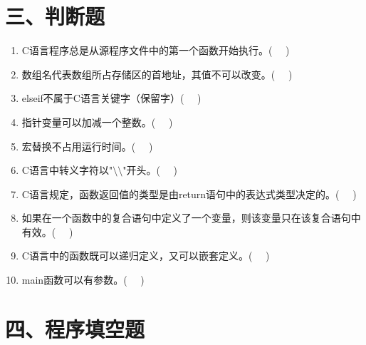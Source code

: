 \documentclass[a4paper,12pt]{article}
\begin{document}
\section*{三、判断题}

\begin{enumerate}
	\item C语言程序总是从源程序文件中的第一个函数开始执行。( \ \ )
	      \vspace{0.3cm}

	\item 数组名代表数组所占存储区的首地址，其值不可以改变。( \ \ )
	      \vspace{0.3cm}

	\item elseif不属于C语言关键字（保留字）( \ \ )
	      \vspace{0.3cm}

	\item 指针变量可以加减一个整数。( \ \ )
	      \vspace{0.3cm}

	\item 宏替换不占用运行时间。( \ \ )
	      \vspace{0.3cm}

	\item C语言中转义字符以"$\setminus\setminus$"开头。( \ \ )
	      \vspace{0.3cm}

	\item C语言规定，函数返回值的类型是由return语句中的表达式类型决定的。( \ \ )
	      \vspace{0.3cm}

	\item 如果在一个函数中的复合语句中定义了一个变量，则该变量只在该复合语句中有效。( \ \ )
	      \vspace{0.3cm}

	\item C语言中的函数既可以递归定义，又可以嵌套定义。( \ \ )
	      \vspace{0.3cm}

	\item main函数可以有参数。( \ \ )
	      \vspace{0.3cm}
\end{enumerate}

\section*{四、程序填空题}
\end{document}
